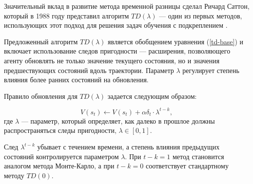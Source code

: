 Значительный вклад в развитие метода временной разницы сделал Ричард Саттон, который в 1988 году представил алгоритм $TD(\lambda)$ — один из первых методов, использующих этот подход для решения задач обучения с подкреплением \cite{td-first-improvement}.

Предложенный алгоритм $TD(\lambda)$ является обобщением уравнения (\ref{td-base}) и включает использование следов пригодности — расширения, позволяющего агенту обновлять не только значение текущего состояния, но и значения предшествующих состояний вдоль траектории. Параметр $\lambda$ регулирует степень влияния более ранних состояний на обновления.

Правило обновления для $TD(\lambda)$ задается следующим образом:

\begin{equation}\label{td-lambda}
    V(s_t) \leftarrow V(s_t) + \alpha \delta_t \cdot \lambda^{t - k},
\end{equation}
где $\lambda$ --- параметр, который определяет, как далеко в прошлое должны распространяться следы пригодности, $\lambda \in [0, 1]$.

След $\lambda^{t-k}$ убывает с течением времени, а степень влияния предыдущих состояний контролируется параметром $\lambda$. При $t-k = 1$ метод становится аналогом метода Монте-Карло, а при $t-k = 0$ соответствует стандартному методу $TD(0)$.
